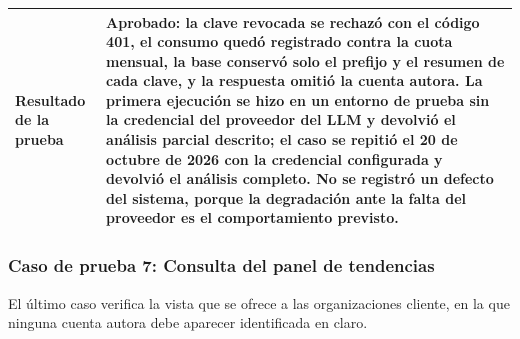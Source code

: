 \begin{small}
\begin{longtable}{@{}>{\raggedright\arraybackslash}p{3.4cm} p{11.8cm}@{}}
    \textbf{Resultado de la prueba} & Aprobado: la clave revocada se rechazó con el código 401, el consumo quedó registrado contra la cuota mensual, la base conservó solo el prefijo y el resumen de cada clave, y la respuesta omitió la cuenta autora. La primera ejecución se hizo en un entorno de prueba sin la credencial del proveedor del LLM y devolvió el análisis parcial descrito; el caso se repitió el 20 de octubre de 2026 con la credencial configurada y devolvió el análisis completo. No se registró un defecto del sistema, porque la degradación ante la falta del proveedor es el comportamiento previsto. \\
    \hline
\end{longtable}
\end{small}

\subsubsection{Caso de prueba 7: Consulta del panel de tendencias}

El último caso verifica la vista que se ofrece a las organizaciones cliente, en la que ninguna cuenta autora debe aparecer identificada en claro.

